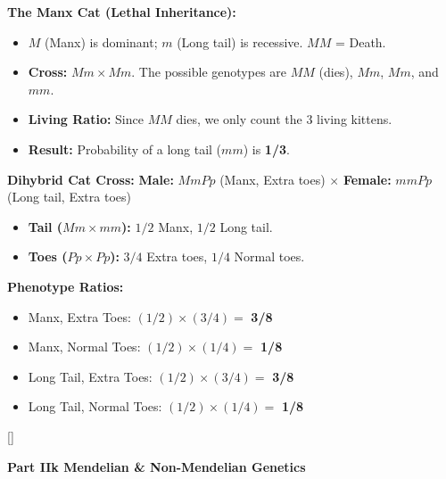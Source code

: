 \documentclass[11pt, letterpaper]{article}
\newcommand{\purplesections}{%
  \titleformat{\section}{\large\bfseries\color{sectionpurple}}{}{0em}{}[\color{sectionpurple}\titlerule]%
  \titleformat{\subsection}{\normalsize\bfseries\color{sectionpurple!80!black}}{}{0em}{}%
}
\newcommand{\partbanner}[3]{%
  \begin{tcolorbox}[colback=#1, colframe=#2, boxrule=1.2pt, arc=4pt,
    left=8pt, right=8pt, top=6pt, bottom=6pt]
    \begin{center}{\LARGE\bfseries #3}\end{center}
  \end{tcolorbox}%
}
\begin{document}
\begin{tcolorbox}[colback=part5bg, colframe=sectionteal, title={\bfseries Part 3: Lethal Alleles \& Dihybrid Phenotypes}, arc=3pt, boxrule=1pt]
\textbf{The Manx Cat (Lethal Inheritance):}
\begin{itemize}[leftmargin=*]
    \item $M$ (Manx) is dominant; $m$ (Long tail) is recessive. $MM$ = Death.
    \item \textbf{Cross:} $Mm \times Mm$. The possible genotypes are $MM$ (dies), $Mm$, $Mm$, and $mm$.
    \item \textbf{Living Ratio:} Since $MM$ dies, we only count the 3 living kittens.
    \item \textbf{Result:} Probability of a long tail ($mm$) is \textbf{1/3}.
\end{itemize}



\textbf{Dihybrid Cat Cross:}
\textbf{Male:} $MmPp$ (Manx, Extra toes) $\times$ \textbf{Female:} $mmPp$ (Long tail, Extra toes)
\begin{itemize}[leftmargin=*]
    \item \textbf{Tail ($Mm \times mm$):} $1/2$ Manx, $1/2$ Long tail.
    \item \textbf{Toes ($Pp \times Pp$):} $3/4$ Extra toes, $1/4$ Normal toes.
\end{itemize}
\textbf{Phenotype Ratios:}
\begin{itemize}[noitemsep]
    \item Manx, Extra Toes: $(1/2) \times (3/4) = $ \textbf{3/8}
    \item Manx, Normal Toes: $(1/2) \times (1/4) = $ \textbf{1/8}
    \item Long Tail, Extra Toes: $(1/2) \times (3/4) = $ \textbf{3/8}
    \item Long Tail, Normal Toes: $(1/2) \times (1/4) = $ \textbf{1/8}
\end{itemize}
\end{tcolorbox}

\newpage

\purplesections
{}
\partbanner{part3bg}{sectionpurple}{Part IIk \quad Mendelian \& Non-Mendelian Genetics}
\end{document}

